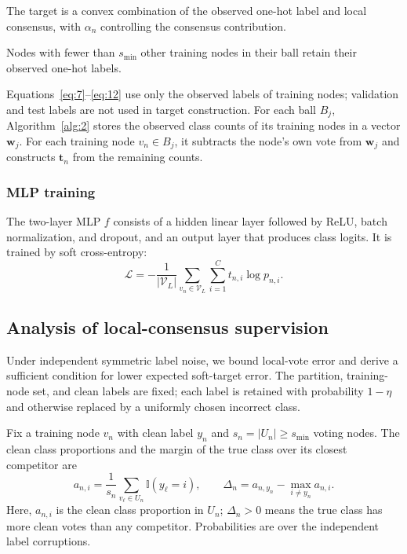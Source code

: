 \documentclass[times,review,10pt]{elsarticle}
\theoremstyle{definition}
\theoremstyle{plain}
\begin{document}
The target is a convex combination of the observed one-hot label and local consensus, with \(\alpha_n\) controlling the consensus contribution.

Nodes with fewer than \(s_{\min}\) other training nodes in their ball retain their observed one-hot labels.

Equations~\eqref{eq:7}--\eqref{eq:12} use only the observed labels of training nodes; validation and test labels are not used in target construction. For each ball \(B_j\), Algorithm~\ref{alg:2} stores the observed class counts of its training nodes in a vector \(\mathbf w_j\). For each training node \(v_n\in B_j\), it subtracts the node's own vote from \(\mathbf w_j\) and constructs \(\mathbf t_n\) from the remaining counts.



\subsubsection{MLP training}\label{sec:3.3.3}

The two-layer MLP \(f\) consists of a hidden linear layer followed by ReLU, batch normalization, and dropout, and an output layer that produces class logits. It is trained by soft cross-entropy:
\begin{equation}\label{eq:13}
\mathcal L=-\frac{1}{|\mathcal V_L|}\sum_{v_n\in\mathcal V_L}\sum_{i=1}^C t_{n,i}\log p_{n,i}.
\end{equation}

\subsection{Analysis of local-consensus supervision}\label{sec:3.4}

Under independent symmetric label noise, we bound local-vote error and derive a sufficient condition for lower expected soft-target error. The partition, training-node set, and clean labels are fixed; each label is retained with probability \(1-\eta\) and otherwise replaced by a uniformly chosen incorrect class.

Fix a training node \(v_n\) with clean label \(y_n\) and \(s_n=|U_n|\geq s_{\min}\) voting nodes. The clean class proportions and the margin of the true class over its closest competitor are
\begin{equation}\label{eq:14}
a_{n,i}=\frac{1}{s_n}\sum_{v_\ell\in U_n}\mathbb I(y_\ell=i),
\qquad
\Delta_n=a_{n,y_n}-\max_{i\ne y_n}a_{n,i}.
\end{equation}
Here, \(a_{n,i}\) is the clean class proportion in \(U_n\); \(\Delta_n>0\) means the true class has more clean votes than any competitor. Probabilities are over the independent label corruptions.
\end{document}
